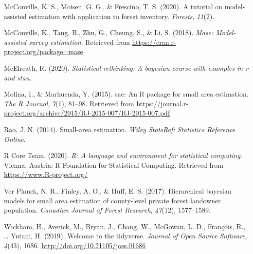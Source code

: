 \documentclass[12pt,twoside]{reedthesis}
\begin{document}
\leavevmode\hypertarget{ref-mcconville2020}{}%
McConville, K. S., Moisen, G. G., \& Frescino, T. S. (2020). A tutorial on model-assisted estimation with application to forest inventory. \emph{Forests}, \emph{11}(2).

\leavevmode\hypertarget{ref-mase}{}%
McConville, K., Tang, B., Zhu, G., Cheung, S., \& Li, S. (2018). \emph{Mase: Model-assisted survey estimation}. Retrieved from \url{https://cran.r-project.org/package=mase}

\leavevmode\hypertarget{ref-statrethinking}{}%
McElreath, R. (2020). \emph{Statistical rethinking: A bayesian course with examples in r and stan}.

\leavevmode\hypertarget{ref-sae-package}{}%
Molina, I., \& Marhuenda, Y. (2015). sae: An R package for small area estimation. \emph{The R Journal}, \emph{7}(1), 81--98. Retrieved from \url{https://journal.r-project.org/archive/2015/RJ-2015-007/RJ-2015-007.pdf}

\leavevmode\hypertarget{ref-rao2014}{}%
Rao, J. N. (2014). Small-area estimation. \emph{Wiley StatsRef: Statistics Reference Online}.

\leavevmode\hypertarget{ref-r-software}{}%
R Core Team. (2020). \emph{R: A language and environment for statistical computing}. Vienna, Austria: R Foundation for Statistical Computing. Retrieved from \url{https://www.R-project.org/}

\leavevmode\hypertarget{ref-ver2017}{}%
Ver Planck, N. R., Finley, A. O., \& Huff, E. S. (2017). Hierarchical bayesian models for small area estimation of county-level private forest landowner population. \emph{Canadian Journal of Forest Research}, \emph{47}(12), 1577--1589.

\leavevmode\hypertarget{ref-tidyverse}{}%
Wickham, H., Averick, M., Bryan, J., Chang, W., McGowan, L. D., François, R., \ldots{} Yutani, H. (2019). Welcome to the tidyverse. \emph{Journal of Open Source Software}, \emph{4}(43), 1686. \url{http://doi.org/10.21105/joss.01686}


\end{document}
